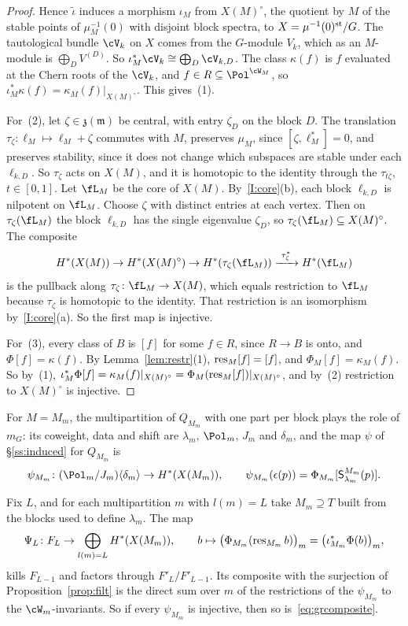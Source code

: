 \documentclass[11pt]{amsart}
\begin{document}
\begin{proof}
Hence $\tilde\iota$ induces a morphism $\iota_M$ from $X(M)^\circ$, the
quotient by $M$ of the stable points of $\mu_M^{-1}(0)$ with disjoint block
spectra, to $X=\mu^{-1}(0)^{\rm st}/G$.  The tautological bundle $\cV_k$ on $X$
comes from the $G$-module $V_k$, which as an $M$-module is
$\bigoplus_DV^{(D)}$.  So $\iota_M^*\cV_k\cong\bigoplus_D\cV_{k,D}$.  The class
$\kappa(f)$ is $f$ evaluated at the Chern roots of the $\cV_k$, and $f\in
R\subseteq\Pol^{\cW_M}$, so $\iota_M^*\kappa(f)=\kappa_M(f)|_{X(M)^\circ}$.  This
gives~(1).

For~(2), let $\zeta\in\mathfrak z(\mathfrak m)$ be central, with entry
$\zeta_D$ on the block $D$.  The translation $\tau_\zeta\colon\ell_M\mapsto\ell_M+\zeta$
commutes with $M$, preserves $\mu_M$, since $[\zeta,\ell_M^*]=0$, and
preserves stability, since it does not change which subspaces are stable
under each $\ell_{k,D}$.  So $\tau_\zeta$ acts on $X(M)$, and it is homotopic to
the identity through the $\tau_{t\zeta}$, $t\in[0,1]$.  Let $\fL_M$ be the core
of $X(M)$.  By~\ref{I:core}(b), each block $\ell_{k,D}$ is nilpotent on
$\fL_M$.  Choose $\zeta$ with distinct entries at each vertex.  Then on
$\tau_\zeta(\fL_M)$ the block $\ell_{k,D}$ has the single eigenvalue $\zeta_D$,
so $\tau_\zeta(\fL_M)\subseteq X(M)^\circ$.  The composite
\[
 H^*(X(M))\to H^*(X(M)^\circ)\to H^*(\tau_\zeta(\fL_M))
 \xrightarrow{\ \tau_\zeta^*\ }H^*(\fL_M)
\]
is the pullback along $\tau_\zeta\colon\fL_M\to X(M)$, which equals restriction
to $\fL_M$ because $\tau_\zeta$ is homotopic to the identity.  That restriction is
an isomorphism by~\ref{I:core}(a).  So the first map is injective.

For~(3), every class of $B$ is $[f]$ for some $f\in R$, since $R\to B$ is
onto, and $\Phi[f]=\kappa(f)$.  By Lemma~\ref{lem:restr}(1),
$\operatorname{res}_M[f]=[f]$, and $\Phi_M[f]=\kappa_M(f)$.  So by~(1),
$\iota_M^*\Phi[f]=\kappa_M(f)|_{X(M)^\circ}=\Phi_M(\operatorname{res}_M[f])|_{X(M)^\circ}$,
and by~(2) restriction to $X(M)^\circ$ is injective.
\end{proof}

For $M=M_m$, the multipartition of $Q_{M_m}$ with one part per block plays the
role of $m_G$: its coweight, data and shift are $\lambda_m$, $\Pol_m$, $J_m$
and $\delta_m$, and the map $\psi$ of \S\ref{ss:induced} for $Q_{M_m}$ is
\[
 \psi_{M_m}\colon(\Pol_m/J_m)\langle\delta_m\rangle\to H^*(X(M_m)),\qquad
 \psi_{M_m}(\epsilon(p))=\Phi_{M_m}[\mathsf S^{M_m}_{\lambda_m}(p)].
\]

\begin{proposition}\label{prop:detect}
Fix $L$, and for each multipartition $m$ with $l(m)=L$ take $M_m\supseteq T$
built from the blocks used to define $\lambda_m$.  The map
\[
 \Psi_L\colon F_L\to\bigoplus_{l(m)=L}H^*(X(M_m)),\qquad
 b\mapsto\big(\Phi_{M_m}(\operatorname{res}_{M_m}b)\big)_m=\big(\iota_{M_m}^*\Phi(b)\big)_m ,
\]
kills $F_{L-1}$ and factors through $F'_L/F'_{L-1}$.  Its composite with the
surjection of Proposition~\ref{prop:filt} is the direct sum over $m$ of the
restrictions of the $\psi_{M_m}$ to the $\cW_m$-invariants.  So if every
$\psi_{M_m}$ is injective, then so is~\eqref{eq:grcomposite}.
\end{proposition}
\end{document}
